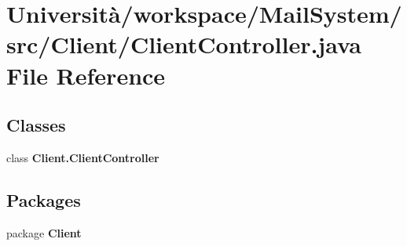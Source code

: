 \section{Università/workspace/\+Mail\+System/src/\+Client/\+Client\+Controller.java File Reference}
\label{_client_controller_8java}
\subsection*{Classes}
\begin{DoxyCompactItemize}
\item 
class \textbf{ Client.\+Client\+Controller}
\end{DoxyCompactItemize}
\subsection*{Packages}
\begin{DoxyCompactItemize}
\item 
package \textbf{ Client}
\end{DoxyCompactItemize}
